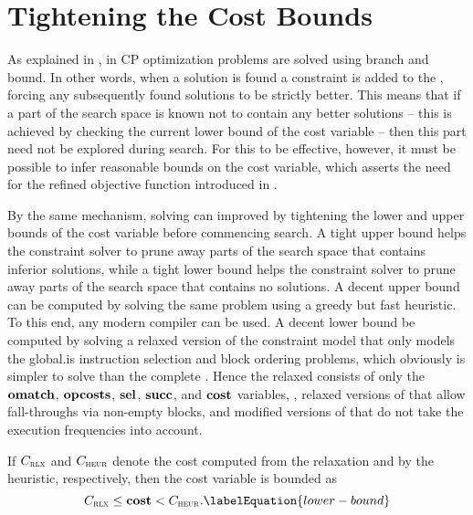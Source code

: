 \section{Tightening the Cost Bounds}

As explained in , in \gls{CP} optimization
problems are solved using \gls{branch and bound}.
%
In other words, when a \gls{solution} is found a \gls{constraint} is added to
the , forcing any subsequently found \glspl{solution}
to be strictly better.
%
This means that if a part of the \gls{search space} is known not to contain any
better \glspl{solution} -- this is achieved by checking the current lower bound
of the \gls{cost variable} -- then this part need not be explored during
\gls{search}.
%
For this to be effective, however, it must be possible to infer reasonable
bounds on the \gls{cost variable}, which asserts the need for the refined
\gls{objective function} introduced in
.

By the same mechanism, solving can improved by tightening the lower and upper
bounds of the \gls{cost variable} before commencing \gls{search}.
%
A tight upper bound helps the \gls{constraint solver} to prune away parts of the
\gls{search space} that contains inferior \glspl{solution}, while a tight lower
bound helps the \gls{constraint solver} to prune away parts of the \gls{search
  space} that contains no \glspl{solution}.
%
A decent upper bound can be computed by solving the same problem using a greedy
but fast heuristic.
%
To this end, any modern \gls{compiler} can be used.
%
A decent lower bound be computed by solving a relaxed version of the
\gls{constraint model} that only models the \gls{global.is} \gls{instruction
  selection} and \gls{block ordering} problems, which obviously is simpler to
solve than the complete .
%
Hence the relaxed  consists of only the
$\mVar{omatch}$, $\mVar{opcosts}$, $\mVar{sel}$, $\mVar{succ}$, and
$\mVar{cost}$ variables, , relaxed versions of
 that allow fall-throughs via
non-empty \glspl{block}, and modified versions of
 that do not take the execution
frequencies into account.

If $C_{\textsc{\textrm{rlx}}}$ and $C_{\textsc{\textrm{heur}}}$ denote the cost computed from the
relaxation and by the heuristic, respectively, then the \gls{cost variable} is
bounded as
%
\begin{equation}
  \mRelaxedCost \leq \mVar{cost} < \mHeuristicCost.
  \labelEquation{lower-bound}
\end{equation}


